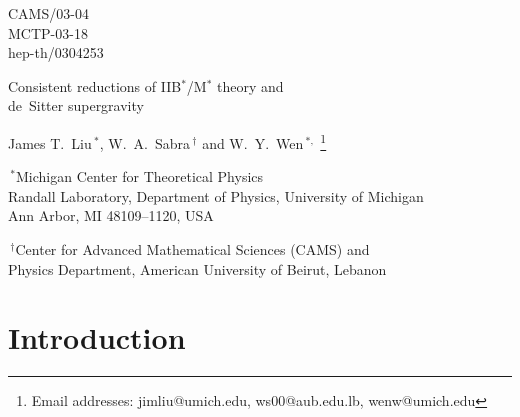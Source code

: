 \documentclass[a4paper,12pt]{article}
\newcommand{\hoch}[1]{$\, ^{#1}$}
\begin{document}
\begin{titlepage}

\begin{flushright}
CAMS/03-04\\
MCTP-03-18\\
hep-th/0304253
\end{flushright}

\vspace{15pt}

\begin{center}

{\LARGE Consistent reductions of IIB$^*$/M$^*$ theory and\\[8pt]
de~Sitter supergravity}

\vspace{15pt}

{James T.~Liu\hoch{*}, W.~A.~Sabra\hoch{\dagger} and W.~Y.~Wen\hoch{*,}%
\footnote{Email addresses: jimliu@umich.edu, ws00@aub.edu.lb,
wenw@umich.edu}}

\vspace{7pt}
\hoch{*}{Michigan Center for Theoretical Physics\\
Randall Laboratory, Department of Physics, University of Michigan\\
Ann Arbor, MI 48109--1120, USA}

\vspace{7pt}
\hoch{\dagger}{Center for Advanced Mathematical Sciences (CAMS) and\\
Physics Department, American University of Beirut, Lebanon}

\end{center}  

\begin{abstract}
We construct consistent non-linear Kaluza Klein reduction ansatze for
a subset of fields arising from the reduction of IIB$^*$ and M$^*$ theory
on dS$_5\times H^5$ and dS$_4\times$AdS$_7$, respectively.  These reductions
yield four and five-dimensional de Sitter supergravities, albeit with wrong
sign kinetic terms.  We also demonstrate that the ansatze may be used to
lift multi-centered de Sitter black hole solutions to ten and eleven
dimensions.  The lifted dS$_5$ black holes correspond to rotating E4-branes
of IIB$^*$ theory.
\end{abstract}

\end{titlepage}

\section{Introduction}
\end{document}
